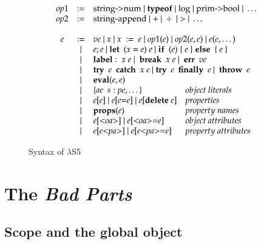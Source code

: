 \documentclass[preprint,9pt]{sigplanconf} %
\begin{document}
\begin{figure}
\[\begin{array}{ccll}
\mopone&:=&\multicolumn{2}{l}{\text{string->num}\ |\ {\bf{typeof}}\ |\ \text{log}\ |\ \text{prim->bool}\ |\ \dots}\\
\moptwo&:=&\multicolumn{2}{l}{\text{string-append}\ |\ \text{+}\ |\ \div\ |\ \text{>}\ |\ \dots}\\\\
\mexp&:=&\multicolumn{2}{l}{\mvexp\ |\ \mvar\ |\ \mvar\ :=\ \mexp\ |\ \mopone(\mexp)\ |\ \moptwo(\mexp, \mexp)\ |\ \mexp(\mexp,\dots)}\\
&|&\multicolumn{2}{l}{\mexp;\mexp\ |\ {\bf{let}}\ \ (\mvar\ \text{=}\ \mexp)\ \mexp\ |\ {\bf{if}}\ \ (\mexp)\ \{\ \mexp\ \}\ {\bf{else}}\ \ \{\ \mexp\ \}}\\
&|&\multicolumn{2}{l}{{\bf{label}}:\ \mvar\ \mexp\ |\ \ {\bf{break}}\ \ \mvar\ \mexp\ |\ \ {\bf{err}}\ \ \mvexp}\\
&|&\multicolumn{2}{l}{{\bf{try}}\ \ \mexp\ \ {\bf{catch}}\ \ \mvar\ \mexp\ |\ {\bf{try}}\ \ \mexp\ \ {\bf{finally}}\ \ \mexp\ |\ \ {\bf{throw}}\ \ \mexp}\\
&|&\multicolumn{2}{l}{{\bf{eval}}(\mexp,\mexp)}\\
&|&\{\maexp\ \ \mstr:\mpexp,\dots\}&object\ literals\\
&|&\mexp\text{[}\mexp\text{]}\ |\ \mexp\text{[}\mexp\text{=}\mexp\text{]}\ |\ \mexp\text{[}{\bf{delete}}\ \mexp\text{]}&properties\\
&|&{\bf{props}}(\mexp)&property\ names\\
&|&\mexp\text{[<}\moattr\text{>]}\ |\ \mexp\text{[<}\moattr\text{>}\text{=}\mexp\text{]}&object\ attributes\\
&|&\mexp\text{[}\mexp\text{<}\mpattr\text{>]}\ |\ \mexp\text{[}\mexp\text{<}\mpattr\text{>=}\mexp\text{]}&property\ attributes\\
\end{array}
\]
\caption{Syntax of $\lambda$S5}
\label{fig:syntax}
\end{figure}

\section{The \emph{Bad Parts}}

\subsection{Scope and the global object}
\end{document}
